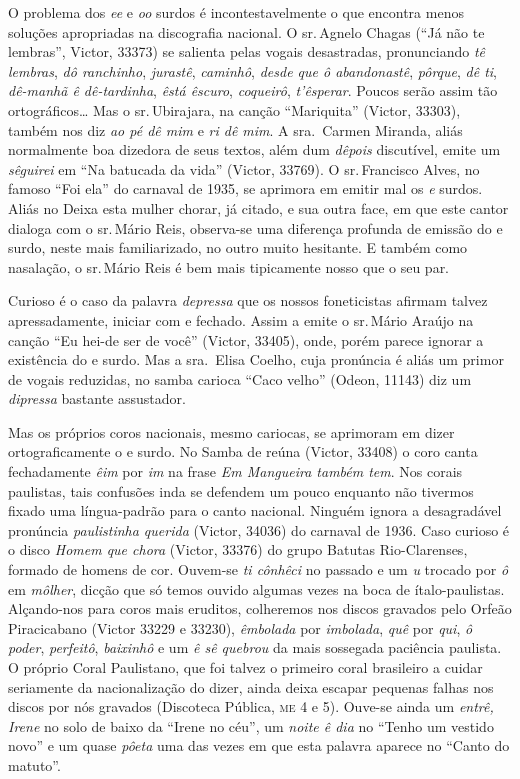 O problema dos \textit{ee} e \textit{oo} surdos é incontestavelmente o que encontra menos
soluções apropriadas na discografia nacional. O sr.\,Agnelo Chagas (``Já
não te lembras'', Victor, 33373) se salienta pelas vogais desastradas,
pronunciando \textit{tê lembras}, \textit{dô ranchinho}, \textit{jurastê}, \textit{caminhô},
\textit{desde que ô abandonastê}, \textit{pôrque}, \textit{dê ti}, \textit{dê-manhã ê
dê-tardinha}, \textit{êstá êscuro}, \textit{coqueirô}, \textit{t'êsperar}. Poucos
serão assim tão ortográficos\ldots{} Mas o sr.\,Ubirajara, na canção
``Mariquita'' (Victor, 33303), também nos diz \textit{ao pé dê mim} e \textit{ri dê
mim}. A sra.\, Carmen Miranda, aliás normalmente boa dizedora de seus
textos, além dum \textit{dêpois} discutível, emite um \textit{sêguirei} em ``Na
batucada da vida'' (Victor, 33769). O sr.\,Francisco Alves, no famoso
``Foi ela'' do carnaval de 1935, se aprimora em emitir mal os \textit{e} surdos.
Aliás no Deixa esta mulher chorar, já citado, e sua outra face, em que
este cantor dialoga com o sr.\,Mário Reis, observa-se uma diferença
profunda de emissão do e surdo, neste mais familiarizado, no outro muito
hesitante. E também como nasalação, o sr.\,Mário Reis é bem mais
tipicamente nosso que o seu par.

Curioso é o caso da palavra \textit{depressa} que os nossos foneticistas
afirmam talvez apressadamente, iniciar com e fechado. Assim a emite o
sr.\,Mário Araújo na canção ``Eu hei-de ser de você'' (Victor, 33405),
onde, porém parece ignorar a existência do e surdo. Mas a sra.\, Elisa
Coelho, cuja pronúncia é aliás um primor de vogais reduzidas, no samba
carioca ``Caco velho'' (Odeon, 11143) diz um \textit{dipressa} bastante
assustador.

Mas os próprios coros nacionais, mesmo cariocas, se aprimoram em dizer
ortograficamente o e surdo. No Samba de reúna (Victor, 33408) o coro
canta fechadamente \textit{êim} por \textit{im} na frase \textit{Em Mangueira também
tem}. Nos corais paulistas, tais confusões inda se defendem um pouco
enquanto não tivermos fixado uma língua-padrão para o canto nacional.
Ninguém ignora a desagradável pronúncia \textit{paulistinha querida} (Victor,
34036) do carnaval de 1936. Caso curioso é o disco \textit{Homem que chora}
(Victor, 33376) do grupo Batutas Rio-Clarenses, formado de
homens de cor. Ouvem-se \textit{ti cônhêci} no passado e um \textit{u} trocado por \textit{ô}
em \textit{môlher}, dicção que só temos ouvido algumas vezes na boca de
ítalo-paulistas. Alçando-nos para coros mais eruditos, colheremos nos
discos gravados pelo Orfeão Piracicabano (Victor 33229 e 33230),
\textit{êmbolada} por \textit{imbolada}, \textit{quê} por \textit{qui}, \textit{ô poder},
\textit{perfeitô}, \textit{baixinhô} e um \textit{ê sê quebrou} da mais sossegada
paciência paulista. O próprio Coral Paulistano, que foi talvez o
primeiro coral brasileiro a cuidar seriamente da nacionalização do
dizer, ainda deixa escapar pequenas falhas nos discos por nós gravados
(Discoteca Pública, \textsc{me} 4 e 5). Ouve-se ainda um \textit{entrê, Irene} no solo
de baixo da ``Irene no céu'', um \textit{noite ê dia} no ``Tenho um vestido
novo'' e um quase \textit{pôeta} uma das vezes em que esta palavra aparece no
``Canto do matuto''.

